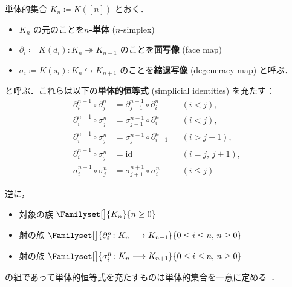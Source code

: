 \documentclass[TQFT_main]{subfiles}
\begin{document}
\begin{mydef}[label=def:SimpSet,breakable]{単体的集合}
    $K_n \coloneqq K([n])$ とおく．
    \begin{itemize}
        \item $K_n$ の元のことを\textbf{$n$-単体} ($n$-simplex)
        \item $\partial_i \coloneqq K(d_i) \colon K_{n} \twoheadrightarrow K_{n-1}$ のことを\textbf{面写像} (face map)
        \item $\sigma_i \coloneqq K(s_i) \colon K_n \hookrightarrow K_{n+1}$ のことを\textbf{縮退写像} (degeneracy map) と呼ぶ．
    \end{itemize}
    と呼ぶ．これらは以下の\textbf{単体的恒等式} (simplicial identities) を充たす：
    \begin{align}
        \partial^{n-1}_i \circ \partial^{n}_j &= \partial^{n-1}_{j-1} \circ \partial^{n}_i&& (i<j), \label{eq:Simp1}\\
        \partial^{n+1}_i \circ \sigma^{n}_j &= \sigma^{n-1}_{j-1} \circ \partial^{n}_i && (i<j), \label{eq:Simp2}\\
        \partial^{n+1}_i \circ \sigma^{n}_j &= \sigma^{n-1}_j \circ \partial^{n}_{i-1} &&(i > j+1), \label{eq:Simp3}\\
        \partial^{n+1}_i \circ \sigma^{n}_j &= \mathrm{id} &&(i = j,\, j+1), \label{eq:Simp4}\\
        \sigma^{n+1}_i \circ \sigma^{n}_j &= \sigma^{n+1}_{j+1} \circ \sigma^{n}_i &&(i \le j) \label{eq:Simp5}
    \end{align}
\end{mydef}

逆に，
\begin{itemize}
    \item 対象の族 $\Familyset[\big]{K_n}{n \ge 0}$
    \item 射の族 $\Familyset[\big]{\partial^n_i \colon K_n \lto K_{n-1}}{0 \le i \le n,\, n \ge 0}$
    \item 射の族 $\Familyset[\big]{\sigma^n_i \colon K_n \lto K_{n+1}}{0 \le i \le n,\, n \ge 0}$
\end{itemize}
の組であって単体的恒等式を充たすものは単体的集合を一意に定める~\cite[Proposition 1.1.2.14]{Kerodon}．
\end{document}
